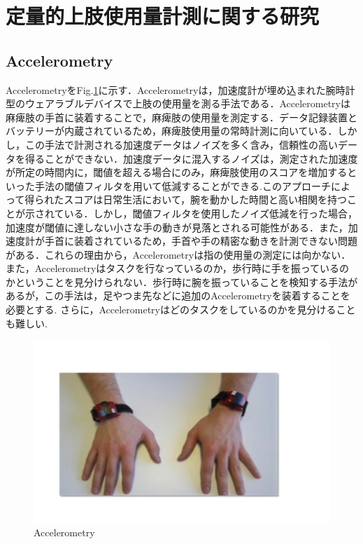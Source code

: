 \section{定量的上肢使用量計測に関する研究}
\subsection*{Accelerometry}
Accelerometry\cite{Chen2005,Hayward2016,Dwiputra2017,VanDerPas2011,VanDerLee2004,Thrane2011}をFig.\ref{fig:Accelerometry}に示す．Accelerometryは，加速度計が埋め込まれた腕時計型のウェアラブルデバイスで上肢の使用量を測る手法である．Accelerometryは麻痺肢の手首に装着することで，麻痺肢の使用量を測定する．データ記録装置とバッテリーが内蔵されているため，麻痺肢使用量の常時計測に向いている\cite{VanDerPas2011}．しかし，この手法で計測される加速度データはノイズを多く含み，信頼性の高いデータを得ることができない．加速度データに混入するノイズは，測定された加速度が所定の時間内に，閾値を超える場合にのみ，麻痺肢使用のスコアを増加するといった手法の閾値フィルタを用いて低減することができる.このアプローチによって得られたスコアは日常生活において，腕を動かした時間と高い相関を持つことが示されている．しかし，閾値フィルタを使用したノイズ低減を行った場合，加速度が閾値に達しない小さな手の動きが見落とされる可能性がある．また，加速度計が手首に装着されているため，手首や手の精密な動きを計測できない問題がある．これらの理由から，Accelerometryは指の使用量の測定には向かない\cite{Uswatte2000}．
また，Accelerometryはタスクを行なっているのか，歩行時に手を振っているのかということを見分けられない．歩行時に腕を振っていることを検知する手法があるが，この手法は，足やつま先などに追加のAccelerometryを装着することを必要とする\cite{Ullery2015}.
さらに，Accelerometryはどのタスクをしているのかを見分けることも難しい\cite{Hayward2016}.
\begin{figure}[H]
  \centering
  \includegraphics[width=0.8\linewidth]{fig/ch1/acc}
  \caption{Accelerometry}
  \label{fig:Accelerometry}
\end{figure}

